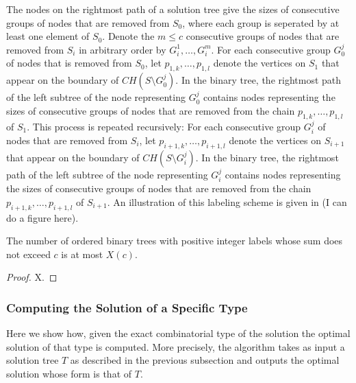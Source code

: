 \documentclass[lotsofwhite]{patmorin}
\begin{document}
The nodes on the rightmost path of a solution tree give the sizes of
consecutive groups of nodes that are removed from $S_0$, where each
group is seperated by at least one element of $S_0$.  Denote the
$m \leq c$ consecutive groups of nodes that are removed from $S_i$ in
arbitrary order by $G_i^1, \dots, G_i^m$. For each consecutive group
$G_0^j$ of nodes that is removed from $S_0$, let $p_{1,k}, \ldots,
p_{1,l}$ denote the vertices on $S_1$ that appear on the boundary of
$CH(S \setminus G_0^j)$. In the binary tree, the rightmost path of the
left subtree of the node representing $G_0^j$ contains nodes
representing the sizes of consecutive groups of nodes that are removed
from the chain $p_{1,k}, \ldots, p_{1,l}$ of $S_1$. This process is
repeated recursively: For each consecutive group $G_i^j$ of nodes that
are removed from $S_i$, let $p_{i+1,k}, \ldots, p_{i+1,l}$ denote the
vertices on $S_{i+1}$ that appear on the boundary of $CH(S \setminus
G_i^j)$. In the binary tree, the rightmost path of the left subtree of
the node representing $G_i^j$ contains nodes representing the sizes of
consecutive groups of nodes that are removed from the chain
$p_{i+1,k}, \ldots, p_{i+1,l}$ of $S_{i+1}$.  An illustration of this
labeling scheme is given in  (I can do a figure here).



\begin{lem}
The number of ordered binary trees with positive integer labels whose
sum does not exceed $c$ is at most $X(c)$.
\end{lem}

\begin{proof}
X.
\end{proof}

\subsubsection{Computing the Solution of a Specific Type}

Here we show how, given the exact combinatorial type of the solution
the optimal solution of that type is computed. More precisely, the
algorithm takes as input a solution tree $T$ as described in the
previous subsection and outputs the optimal solution whose form is
that of $T$.
\end{document}
